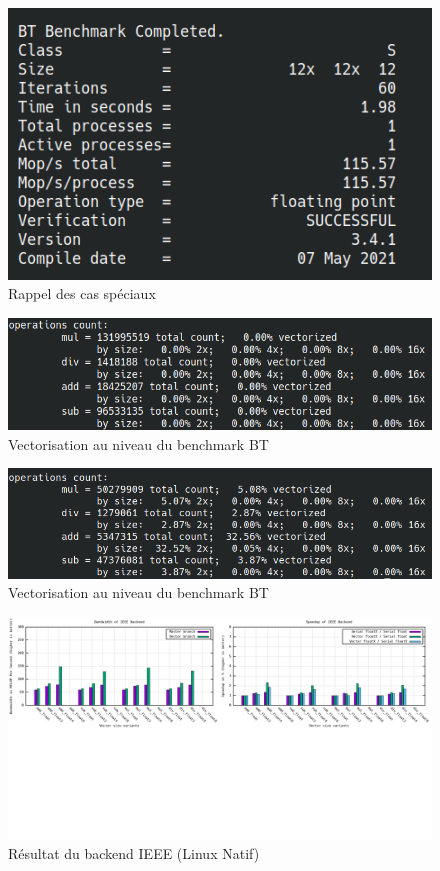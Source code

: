 \documentclass[11pt, letterpaper]{article}
\begin{document}
\label{org004c21c}
\begin{figure}[htbp]
\centering
\includegraphics[width=450px]{../ressources/btcompleted.png}
\caption{\label{fig:org8304c57}Rappel des cas spéciaux}
\end{figure}

\label{org451b01f}
\begin{figure}[htbp]
\centering
\includegraphics[width=450px]{../ressources/vect1.png}
\caption{\label{fig:org6f6afab}Vectorisation au niveau du benchmark BT}
\end{figure}

\label{org5e703af}
\begin{figure}[htbp]
\centering
\includegraphics[width=450px]{../ressources/vcopenmp.png}
\caption{\label{fig:org44bdd6e}Vectorisation au niveau du benchmark BT}
\end{figure}

\label{orgf5d9dc4}
\begin{figure}[htbp]
\centering
\includegraphics[width=450px]{../ressources/laptop_ieee.png}
\caption{\label{fig:org468af02}Résultat du backend IEEE (Linux Natif)}
\end{figure}
\end{document}
